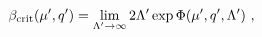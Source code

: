 \begin{equation}
\beta_{\rm crit}(\mu', q') = \lim_{\Lambda' \to \infty} 2 \Lambda' \exp \Phi(\mu',q',\Lambda') \ ,
\label{t18a}
\end{equation}

